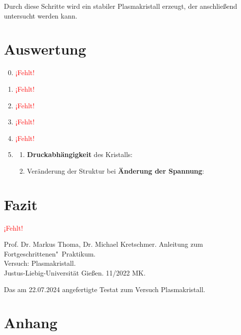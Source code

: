 \documentclass[12pt,a4paper,ngerman]{report}
\providecommand{\fehlt}{\textcolor{red}{{ ¡Fehlt! }}}
\begin{document}
Durch diese Schritte wird ein stabiler Plasmakristall erzeugt, der anschließend untersucht werden kann.	


\chapter{Auswertung}
	
	\begin{enumerate}[font=\bfseries]
		\setcounter{enumi}{-1}
		\item \fehlt
		\item \fehlt
		\item \fehlt
		\item \fehlt
		\item \fehlt
		\item \begin{enumerate}[font=\bfseries, label=\alph*)]
			\item \textbf{Druckabhängigkeit} des Kristalls: 
			\item Veränderung der Struktur bei \textbf{Änderung der Spannung}: 
		\end{enumerate}
			
	\end{enumerate}

\chapter{Fazit}
	\fehlt

\listoffigures%
	
\begin{thebibliography}{111}%
	Prof. Dr. Markus Thoma, Dr. Michael Kretschmer. Anleitung zum Fortgeschrittenen"~Praktikum.\\ \glqq Versuch: Plasmakristall\grqq.\\ Justus-Liebig-Universität Gießen. 11/2022 MK.
	
		Das am 22.07.2024 angefertigte Testat zum Versuch \glqq Plasmakristall\grqq.
	\end{thebibliography}


\chapter*{Anhang}\label{ch:Anhang}
\FloatBarrier
\end{document}
